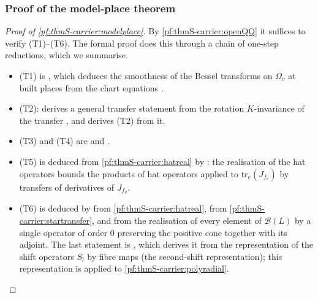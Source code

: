 \subsubsection{Proof of the model-place theorem}

\begin{proof}[Proof of \cref{pf:thmS-carrier:modelplace}]
By \cref{pf:thmS-carrier:openQQ} it suffices to verify (T1)--(T6). The formal proof does this through a chain of one-step
reductions, which we summarise.
\begin{itemize}
\item (T1) is , which deduces the smoothness of the
  Bessel transforms on $\Omega_v$ at built places from the chart equations
  .
\item (T2):  derives a general transfer statement
  from the rotation $K$-invariance of the transfer
  , and
   derives (T2) from it.
\item (T3) and (T4) are  and
  .
\item (T5) is deduced from \cref{pf:thmS-carrier:hatreal} by
  : the realisation of the hat operators bounds the products
  of hat operators applied to $\mathrm{tr}_e(J_{f_v})$ by transfers of derivatives of $J_{f_v}$.
\item (T6) is deduced by  from \cref{pf:thmS-carrier:hatreal},
  from \cref{pf:thmS-carrier:startransfer}, and from the realisation of every element of $\mathcal B(L)$ by a single operator
  of order $0$ preserving the positive cone together with its adjoint. The last statement is
  , which derives it from the representation of the
  shift operators $S_l$ by fibre maps (the second-shift representation); this representation is
   applied to \cref{pf:thmS-carrier:polyradial}.
\end{itemize}
\end{proof}


